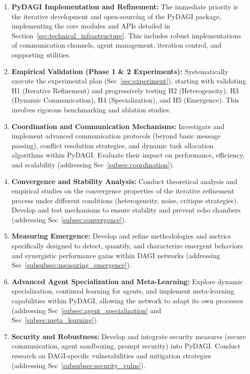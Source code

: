 \documentclass[12pt]{amsart}
\begin{document}
\begin{enumerate}[leftmargin=*]
    \item \textbf{PyDAGI Implementation and Refinement:} The immediate priority is the iterative development and open-sourcing of the PyDAGI package, implementing the core modules and APIs detailed in Section~\ref{sec:technical_infrastructure}. This includes robust implementations of communication channels, agent management, iteration control, and supporting utilities.
    \item \textbf{Empirical Validation (Phase 1 & 2 Experiments):} Systematically execute the experimental plan (Sec~\ref{sec:experiment}), starting with validating H1 (Iterative Refinement) and progressively testing H2 (Heterogeneity), H3 (Dynamic Communication), H4 (Specialization), and H5 (Emergence). This involves rigorous benchmarking and ablation studies.
    \item \textbf{Coordination and Communication Mechanisms:} Investigate and implement advanced communication protocols (beyond basic message passing), conflict resolution strategies, and dynamic task allocation algorithms within PyDAGI. Evaluate their impact on performance, efficiency, and scalability (addressing Sec~\ref{subsec:coordination}).
    \item \textbf{Convergence and Stability Analysis:} Conduct theoretical analysis and empirical studies on the convergence properties of the iterative refinement process under different conditions (heterogeneity, noise, critique strategies). Develop and test mechanisms to ensure stability and prevent echo chambers (addressing Sec~\ref{subsec:convergence}).
    \item \textbf{Measuring Emergence:} Develop and refine methodologies and metrics specifically designed to detect, quantify, and characterize emergent behaviors and synergistic performance gains within DAGI networks (addressing Sec~\ref{subsubsec:measuring_emergence}).
    \item \textbf{Advanced Agent Specialization and Meta-Learning:} Explore dynamic specialization, continual learning for agents, and implement meta-learning capabilities within PyDAGI, allowing the network to adapt its own processes (addressing Sec~\ref{subsec:agent_specialization} and Sec~\ref{subsec:meta_learning}).
    \item \textbf{Security and Robustness:} Develop and integrate security measures (secure communication, agent sandboxing, prompt security) into PyDAGI. Conduct research on DAGI-specific vulnerabilities and mitigation strategies (addressing Sec~\ref{subsubsec:security_vulns}).

\end{enumerate}
\end{document}
